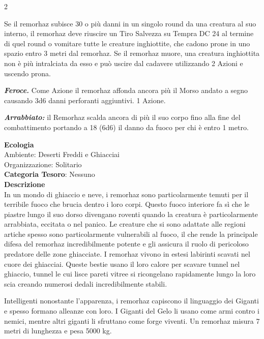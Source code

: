 \begin{multicols}{2}
{Se il remorhaz subisce 30 o più danni in un singolo round da una creatura al suo interno, il remorhaz deve riuscire un Tiro Salvezza su Tempra DC 24 al termine di quel round o vomitare tutte le creature inghiottite, che cadono prone in uno spazio entro 3 metri dal remorhaz. Se il remorhaz muore, una creatura inghiottita non è più intralciata da esso e può uscire dal cadavere utilizzando 2 Azioni e uscendo prona.

\emph{\textbf{Feroce.}} Come Azione il remorhaz affonda ancora più il Morso andato a segno causando 3d6 danni perforanti aggiuntivi. 1 Azione.

\emph{\textbf{Arrabbiato:}} il Remorhaz scalda ancora di più il suo corpo fino alla fine del combattimento portando a 18 (6d6) il danno da fuoco per chi è entro 1 metro.

\textbf{Ecologia}\\
Ambiente: Deserti Freddi e Ghiacciai\\
Organizzazione: Solitario\\
\textbf{Categoria Tesoro}: Nessuno\\
\textbf{Descrizione}\\
In un mondo di ghiaccio e neve, i remorhaz sono particolarmente temuti per il terribile fuoco che brucia dentro i loro corpi. Questo fuoco interiore fa sì che le piastre lungo il suo dorso divengano roventi quando la creatura è particolarmente arrabbiata, eccitata o nel panico. Le creature che si sono adattate alle regioni artiche spesso sono particolarmente vulnerabili al fuoco, il che rende la principale difesa del remorhaz incredibilmente potente e gli assicura il ruolo di pericoloso predatore delle zone ghiacciate. I remorhaz vivono in estesi labirinti scavati nel cuore dei ghiacciai. Queste bestie usano il loro calore per scavare tunnel nel ghiaccio, tunnel le cui lisce pareti vitree si ricongelano rapidamente lungo la loro scia creando numerosi dedali incredibilmente stabili.

Intelligenti nonostante l'apparenza, i remorhaz capiscono il linguaggio dei Giganti e spesso formano alleanze con loro. I Giganti del Gelo li usano come armi contro i nemici, mentre altri giganti li sfruttano come forge viventi. Un remorhaz misura 7 metri di lunghezza e pesa 5000 kg.

}
\end{multicols}
